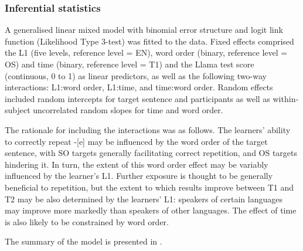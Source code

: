 \subsubsection{Inferential statistics}\label{sec:04:2.3.2}

A generalised linear mixed model \citep{Baayen2008} with binomial error structure and logit link function (Likelihood Type 3-test) was fitted to the data. Fixed effects comprised the L1 (five levels, reference level = EN), word order (binary, reference level = OS) and time (binary, reference level = T1) and the Llama test score (continuous, 0 to 1) as linear predictors, as well as the following two-way interactions: L1:word order, L1:time, and time:word order. Random effects included random intercepts for target sentence and participants as well as within-subject uncorrelated random slopes for time and word order. 

The rationale for including the interactions was as follows. The learners' ability to correctly repeat -[e] may be influenced by the word order of the target sentence, with SO targets generally facilitating correct repetition, and OS targets hindering it. In turn, the extent of this word order effect may be variably influenced by the learner’s L1. Further exposure is thought to be generally beneficial to repetition, but the extent to which results improve between T1 and T2 may be also determined by the learners’ L1: speakers of certain languages may improve more markedly than speakers of other languages. The effect of time is also likely to be constrained by word order. 

The summary of the model is presented in .

